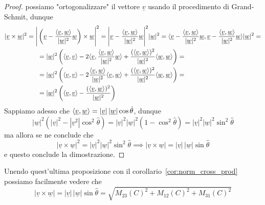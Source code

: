 \begin{proof}
possiamo "ortogonalizzare" il vettore $\underline{v}$ usando il procedimento di Grand-Schmit, dunque
\begin{align*}|\underline{v} \times \underline{w}|^2 = \Bigg| &\left( \underline{v} - \frac{\langle \underline{v}, \underline{w} \rangle}{|\underline{w}|^2} \underline{w} \right) \times \underline{w} \Bigg|^2 = \Bigg| \underline{v} - \frac{\langle \underline{v}, \underline{w} \rangle}{|\underline{w}|^2} \underline{w} \Bigg|^2 |\underline{w}|^2 = \langle \underline{v} - \frac{\langle \underline{v}, \underline{w} \rangle}{|\underline{w}|^2} \underline{w}, \underline{v} - \frac{\langle \underline{v}, \underline{w} \rangle}{|\underline{w}|^2} \underline{w} \rangle |\underline{w}|^2 = \\
&= |\underline{w}|^2 \left( \langle \underline{v}, \underline{v} \rangle - 2 \langle \underline{v}, \frac{\langle \underline{v}, \underline{w} \rangle}{|\underline{w}|^2} \underline{w} \rangle + \frac{(\langle \underline{v}, \underline{w} \rangle)^2}{|\underline{w}|^2} \langle \underline{w}, \underline{w} \rangle \right) = \\
&= |\underline{w}|^2 \left( \langle \underline{v}, \underline{v} \rangle - 2 \frac{\langle \underline{v}, \underline{w} \rangle}{|\underline{w}|^2} \langle \underline{v}, \underline{w} \rangle + \frac{(\langle \underline{v}, \underline{w} \rangle)^2}{|\underline{w}|^2} \langle \underline{w}, \underline{w} \rangle \right) = \\
&= |\underline{w}|^2 \left( \langle \underline{v}, \underline{v} \rangle - \frac{(\langle \underline{v}, \underline{w} \rangle)^2}{|\underline{w}|^2} \right)
\end{align*}
Sappiamo adesso che $\langle \underline{v}, \underline{w} \rangle = |\underline{v}| \, |\underline{w}|\cos{\hat{\theta}}$, dunque
$$
|\underline{w}|^2 \left(|\underline{v}|^2 - |\underline{v}^2|\cos^2{\hat{\theta}} \right) = |\underline{v}|^2 |\underline{w}|^2 (1-\cos^2{\hat{\theta}}) = |\underline{v}|^2 |\underline{w}|^2 \sin^2{\hat{\theta}}
$$
ma allora se ne conclude che
$$
|\underline{v} \times \underline{w}|^2 = |\underline{v}|^2 |\underline{w}|^2 \sin^2{\hat{\theta}} \implies |\underline{v} \times \underline{w}| = |\underline{v}| \, |\underline{w}|\sin{\hat{\theta}}
$$
e questo conclude la dimostrazione.
\end{proof}
\begin{remark}
Unendo quest'ultima proposizione con il corollario~\ref{cor:norm_cross_prod} possiamo facilmente vedere che
$$
|\underline{v} \times \underline{w}| = |\underline{v}| \, |\underline{w}| \sin{\hat{\theta}} = \sqrt{M_{23}(C)^2 + M_{12}(C)^2 + M_{31}(C)^2}
$$
\end{remark}
